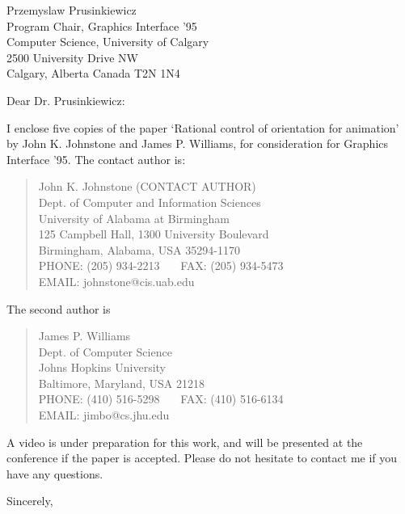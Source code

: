\address{\ \ }
\signature{Prof. John K. Johnstone}

\begin{letter}
{Przemyslaw Prusinkiewicz\\
Program Chair, Graphics Interface '95\\
Computer Science, University of Calgary\\
2500 University Drive NW\\
Calgary, Alberta
Canada  T2N 1N4
}

\opening{Dear Dr. Prusinkiewicz:}

I enclose five copies of the paper `Rational control of orientation for
animation' by John K. Johnstone and James P. Williams,
for consideration for Graphics Interface '95.
The contact author is:
	
\begin{quote}
	John K. Johnstone (CONTACT AUTHOR)\\
	Dept. of Computer and Information Sciences\\
	University of Alabama at Birmingham\\
	125 Campbell Hall, 1300 University Boulevard\\
	Birmingham, Alabama, USA   35294-1170\\
	PHONE: (205) 934-2213 \ \ \ FAX: (205) 934-5473\\
	EMAIL: johnstone@cis.uab.edu
\end{quote}

The second author is

\begin{quote}
	James P. Williams\\
	Dept. of Computer Science\\
	Johns Hopkins University\\
	Baltimore, Maryland, USA	 21218\\
	PHONE: (410) 516-5298 \ \ \ FAX: (410) 516-6134\\
	EMAIL: jimbo@cs.jhu.edu
\end{quote}

A video is under preparation for this work,
and will be presented at the conference if the paper is accepted.
Please do not hesitate to contact me if you have any questions.

\closing{Sincerely,}
\end{letter}

